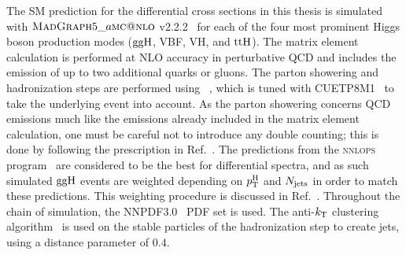 The SM prediction for the differential cross sections in this thesis is simulated with $\textsc{MadGraph}{}5\_a\textsc{mc@nlo}$ v2.2.2~\cite{Alwall:2014hca} for each of the four most prominent Higgs boson production modes ($\mathrm{g}\mathrm{g}\mathrm{H}$, VBF, VH, and $\mathrm{t}\mathrm{t}\mathrm{H}$).
% 
The matrix element calculation is performed at NLO accuracy in perturbative QCD and includes the emission of up to two additional quarks or gluons.
% 
The parton showering and hadronization steps are performed using ~\cite{Sjostrand:2014zea}, which is tuned with CUETP8M1~\cite{Skands:1695787} to take the underlying event into account.
% 
As the parton showering concerns QCD emissions much like the emissions already included in the matrix element calculation, one must be careful not to introduce any double counting; this is done by following the prescription in Ref.~\cite{Frederix:2012ps}.
% 
The predictions from the {\textsc{nnlops}} program~\cite{Hamilton:2012np, Kardos:2014dua} are considered to be the best for differential spectra, and as such simulated $\mathrm{g}\mathrm{g}\mathrm{H}$ events are weighted depending on $p_\mathrm{T}^\mathrm{H}$ and $N_\text{jets} $ in order to match these predictions.
% 
This weighting procedure is discussed in Ref.~\cite{Sirunyan:2018koj}.
% 
Throughout the chain of simulation, the NNPDF3.0~\cite{Ball:2014uwa} PDF set is used.
% 
The anti-$k_\mathrm{T}$ clustering algorithm~\cite{Cacciari:2008gp} is used on the stable particles of the hadronization step to create jets, using a distance parameter of $0.4$.



